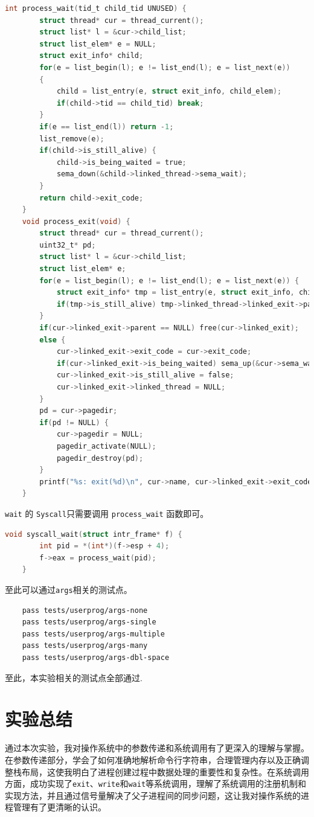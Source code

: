 \documentclass{article}
\begin{document}
\begin{lstlisting}[language=C]
	int process_wait(tid_t child_tid UNUSED) { 
		struct thread* cur = thread_current();
		struct list* l = &cur->child_list; 
		struct list_elem* e = NULL; 
		struct exit_info* child; 
		for(e = list_begin(l); e != list_end(l); e = list_next(e))
		{ 
			child = list_entry(e, struct exit_info, child_elem); 
			if(child->tid == child_tid) break; 
		}
		if(e == list_end(l)) return -1; 
		list_remove(e);
		if(child->is_still_alive) { 
			child->is_being_waited = true; 
			sema_down(&child->linked_thread->sema_wait); 
		}
		return child->exit_code; 
	}
	void process_exit(void) { 
		struct thread* cur = thread_current(); 
		uint32_t* pd;
		struct list* l = &cur->child_list; 
		struct list_elem* e; 
		for(e = list_begin(l); e != list_end(l); e = list_next(e)) { 
			struct exit_info* tmp = list_entry(e, struct exit_info, child_elem);
			if(tmp->is_still_alive) tmp->linked_thread->linked_exit->parent = NULL; 
		}
		if(cur->linked_exit->parent == NULL) free(cur->linked_exit); 
		else { 
			cur->linked_exit->exit_code = cur->exit_code; 
			if(cur->linked_exit->is_being_waited) sema_up(&cur->sema_wait);
			cur->linked_exit->is_still_alive = false; 
			cur->linked_exit->linked_thread = NULL; 
		}
		pd = cur->pagedir; 
		if(pd != NULL) { 
			cur->pagedir = NULL; 
			pagedir_activate(NULL); 
			pagedir_destroy(pd); 
		}
		printf("%s: exit(%d)\n", cur->name, cur->linked_exit->exit_code); 
	}
\end{lstlisting}

\texttt{wait} 的 \texttt{Syscall}只需要调用 \texttt{process\_wait} 函数即可。

\begin{lstlisting}[language=C]
	void syscall_wait(struct intr_frame* f) { 
		int pid = *(int*)(f->esp + 4); 
		f->eax = process_wait(pid); 
	}
\end{lstlisting}

至此可以通过\texttt{args}相关的测试点。

\begin{lstlisting}
	pass tests/userprog/args-none 
	pass tests/userprog/args-single 
	pass tests/userprog/args-multiple 
	pass tests/userprog/args-many 
	pass tests/userprog/args-dbl-space
\end{lstlisting}

至此，本实验相关的测试点全部通过.

\section{实验总结}

通过本次实验，我对操作系统中的参数传递和系统调用有了更深入的理解与掌握。在参数传递部分，学会了如何准确地解析命令行字符串，合理管理内存以及正确调整栈布局，这使我明白了进程创建过程中数据处理的重要性和复杂性。在系统调用方面，成功实现了\texttt{exit}、\texttt{write}和\texttt{wait}等系统调用，理解了系统调用的注册机制和实现方法，并且通过信号量解决了父子进程间的同步问题，这让我对操作系统的进程管理有了更清晰的认识。
\end{document}
